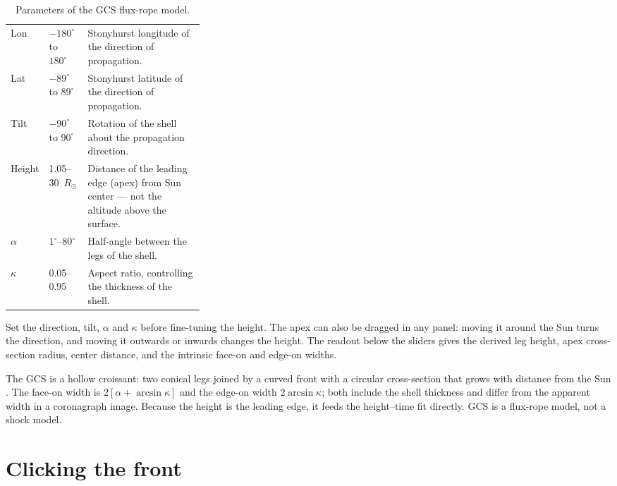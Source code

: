 \begin{table}[!htbp]
  \centering
  \caption{Parameters of the GCS flux-rope model.}
  \label{tab:gcs-params}
  \small
  \begin{tabularx}{\linewidth}{@{}P{0.12\linewidth}P{0.2\linewidth}L@{}}
    \toprule
     &  &  \\
    \midrule
    Lon & \(-180^\circ\) to \(180^\circ\) & Stonyhurst longitude of the direction of propagation. \\
    Lat & \(-89^\circ\) to \(89^\circ\) & Stonyhurst latitude of the direction of propagation. \\
    Tilt & \(-90^\circ\) to \(90^\circ\) & Rotation of the shell about the propagation direction. \\
    Height & 1.05--30~\(R_\odot\) & Distance of the leading edge (apex) from Sun center --- not the altitude above the surface. \\
    \(\alpha\) & \(1^\circ\)--\(80^\circ\) & Half-angle between the legs of the shell. \\
    \(\kappa\) & 0.05--0.95 & Aspect ratio, controlling the thickness of the shell. \\
    \bottomrule
  \end{tabularx}
\end{table}

Set the direction, tilt, \(\alpha\) and \(\kappa\) before fine-tuning the height. The apex can
also be dragged in any panel: moving it around the Sun turns the direction, and moving it
outwards or inwards changes the height. The readout below the sliders gives the derived leg
height, apex cross-section radius, center distance, and the intrinsic face-on and edge-on
widths.

\begin{background}
  The GCS is a hollow croissant: two conical legs joined by a curved front with a circular
  cross-section that grows with distance from the Sun \parencite{thernisien2006,thernisien2011}.
  The face-on width is \(2[\alpha + \arcsin\kappa]\) and the edge-on width \(2\arcsin\kappa\);
  both include the shell thickness and differ from the apparent width in a coronagraph image.
  Because the height is the leading edge, it feeds the height--time fit directly. GCS is a
  flux-rope model, not a shock model.
\end{background}

\section{Clicking the front}
\label{sec:front-points}

